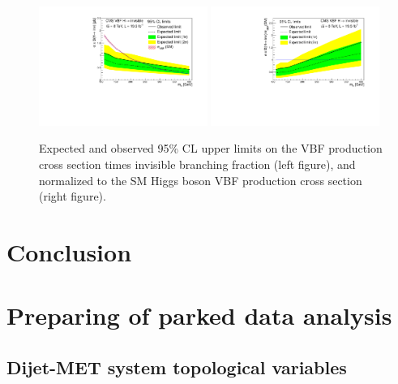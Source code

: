 
\begin{figure}[htp]
\centering
\includegraphics[width=0.49\textwidth]{Chapter05/Images/vbfxslimit.pdf}
\includegraphics[width=0.49\textwidth]{Chapter05/Images/vbflimit.pdf}
\caption{Expected and observed 95\% CL upper limits on the VBF production cross section times invisible branching fraction (left figure), and normalized to the \gls{SM} Higgs boson \gls{VBF} production cross section (right figure). \cite{ARTICLE:CMSVBFHiggsToInvAndZHCombination}}
\label{FIGURE:vbfLimit}
\end{figure}


\section{Conclusion}



\section{Preparing of parked data analysis}

\subsection{Dijet-MET system topological variables}

